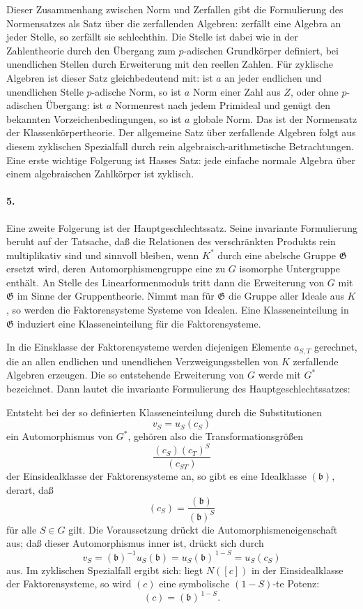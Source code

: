 \documentclass[11pt]{article}
\begin{document}
Dieser Zusammenhang zwischen Norm und Zerfallen gibt die Formulierung des Normensatzes als Satz über die zerfallenden Algebren: zerfällt eine Algebra an jeder Stelle, so zerfällt sie schlechthin. Die Stelle ist dabei wie in der Zahlentheorie durch den Übergang zum \(p\)-adischen Grundkörper definiert, bei unendlichen Stellen durch Erweiterung mit den reellen Zahlen. Für zyklische Algebren ist dieser Satz gleichbedeutend mit: ist \(a\) an jeder endlichen und unendlichen Stelle \(p\)-adische Norm, so ist \(a\) Norm einer Zahl aus \(Z\), oder ohne \(p\)-adischen Übergang: ist \(a\) Normenrest nach jedem Primideal und genügt den bekannten Vorzeichenbedingungen, so ist \(a\) globale Norm. Das ist der Normensatz der Klassenkörpertheorie. Der allgemeine Satz über zerfallende Algebren folgt aus diesem zyklischen Spezialfall durch rein algebraisch-arithmetische Betrachtungen. Eine erste wichtige Folgerung ist Hasses Satz: jede einfache normale Algebra über einem algebraischen Zahlkörper ist zyklisch.

\paragraph{5.}
Eine zweite Folgerung ist der Hauptgeschlechtssatz. Seine invariante Formulierung beruht auf der Tatsache, daß die Relationen des verschränkten Produkts rein multiplikativ sind und sinnvoll bleiben, wenn \(K^*\) durch eine abelsche Gruppe \(\mathfrak G\) ersetzt wird, deren Automorphismengruppe eine zu \(G\) isomorphe Untergruppe enthält. An Stelle des Linearformenmoduls tritt dann die Erweiterung von \(G\) mit \(\mathfrak G\) im Sinne der Gruppentheorie. Nimmt man für \(\mathfrak G\) die Gruppe aller Ideale aus \(K\), so werden die Faktorensysteme Systeme von Idealen. Eine Klasseneinteilung in \(\mathfrak G\) induziert eine Klasseneinteilung für die Faktorensysteme.

In die Einsklasse der Faktorensysteme werden diejenigen Elemente \(a_{S,T}\) gerechnet, die an allen endlichen und unendlichen Verzweigungsstellen von \(K\) zerfallende Algebren erzeugen. Die so entstehende Erweiterung von \(G\) werde mit \(G^*\) bezeichnet. Dann lautet die invariante Formulierung des Hauptgeschlechtssatzes:

Entsteht bei der so definierten Klasseneinteilung durch die Substitutionen
\[
        v_S=u_S(c_S)
\]
ein Automorphismus von \(G^*\), gehören also die Transformationsgrößen
\[
        \frac{(c_S)(c_T)^S}{(c_{ST})}
\]
der Einsidealklasse der Faktorensysteme an, so gibt es eine Idealklasse \((\mathfrak b)\), derart, daß
\[
        (c_S)=\frac{(\mathfrak b)}{(\mathfrak b)^S}
\]
für alle \(S\in G\) gilt. Die Voraussetzung drückt die Automorphismeneigenschaft aus; daß dieser Automorphismus inner ist, drückt sich durch
\[
        v_S=(\mathfrak b)^{-1}u_S(\mathfrak b)=u_S(\mathfrak b)^{\,1-S}
        =u_S(c_S)
\]
aus. Im zyklischen Spezialfall ergibt sich: liegt \(N([c])\) in der Einsidealklasse der Faktorensysteme, so wird \((c)\) eine symbolische \((1-S)\)-te Potenz:
\[
        (c)=(\mathfrak b)^{\,1-S}.
\]
\end{document}
